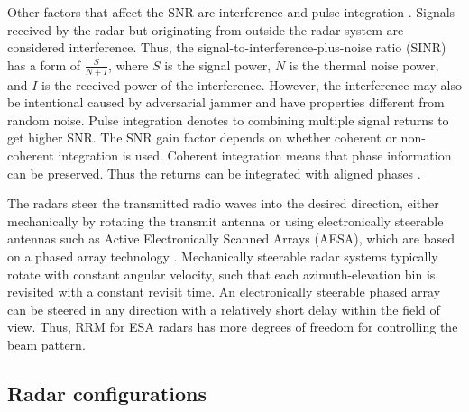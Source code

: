 \documentclass[english, 12pt, a4paper, elec, utf8, a-1b, online]{aaltothesis}
\numberwithin{equation}{section}
\begin{document}
Other factors that affect the SNR are interference and pulse integration \cite{Curry2011}.
Signals received by the radar but originating from outside the radar system are considered interference.
Thus, the signal-to-interference-plus-noise ratio (SINR) has a form of $\frac{S}{N+I}$, where
$S$ is the signal power,
$N$ is the thermal noise power, and
$I$ is the received power of the interference.
However, the interference may also be intentional caused by adversarial jammer and have properties different from random noise. 
Pulse integration denotes to combining multiple signal returns to get higher SNR.
The SNR gain factor depends on whether coherent or non-coherent integration is used.
Coherent integration means that phase information can be preserved. 
Thus the returns can be integrated with aligned phases \cite{Curry2011}.

The radars steer the transmitted radio waves into the desired direction, either mechanically by rotating the transmit antenna \cite{Curry2011} or using electronically steerable antennas such as Active Electronically Scanned Arrays (AESA), which are based on a phased array technology \cite{Mailloux2017}.
Mechanically steerable radar systems typically rotate with constant angular velocity, such that each azimuth-elevation bin is revisited with a constant revisit time.
An electronically steerable phased array can be steered in any direction with a relatively short delay within the field of view.
Thus, RRM for ESA radars has more degrees of freedom for controlling the beam pattern.


\subsection{Radar configurations} \label{sec:radar_types}
\end{document}
